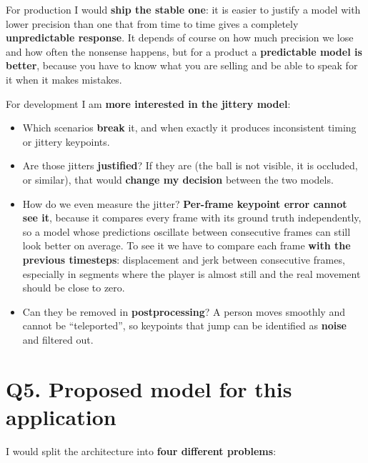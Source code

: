 \documentclass[11pt,a4paper]{article}
\begin{document}
For production I would \textbf{ship the stable one}: it is easier to justify a model with
lower precision than one that from time to time gives a completely \textbf{unpredictable
response}. It depends of course on how much precision we lose and how often the nonsense
happens, but for a product a \textbf{predictable model is better}, because you have to know
what you are selling and be able to speak for it when it makes mistakes.

For development I am \textbf{more interested in the jittery model}:

\begin{itemize}
  \item Which scenarios \textbf{break} it, and when exactly it produces inconsistent timing or
    jittery keypoints.
  \item Are those jitters \textbf{justified}? If they are (the ball is not visible, it is
    occluded, or similar), that would \textbf{change my decision} between the two models.
  \item How do we even measure the jitter? \textbf{Per-frame keypoint error cannot see it},
    because it compares every frame with its ground truth independently, so a model whose
    predictions oscillate between consecutive frames can still look better on average. To see it
    we have to compare each frame \textbf{with the previous timesteps}: displacement and jerk
    between consecutive frames, especially in segments where the player is almost still and the
    real movement should be close to zero.
  \item Can they be removed in \textbf{postprocessing}? A person moves smoothly and cannot be
    ``teleported'', so keypoints that jump can be identified as \textbf{noise} and filtered
    out.
\end{itemize}

\section*{Q5. Proposed model for this application}

I would split the architecture into \textbf{four different problems}:
\end{document}
